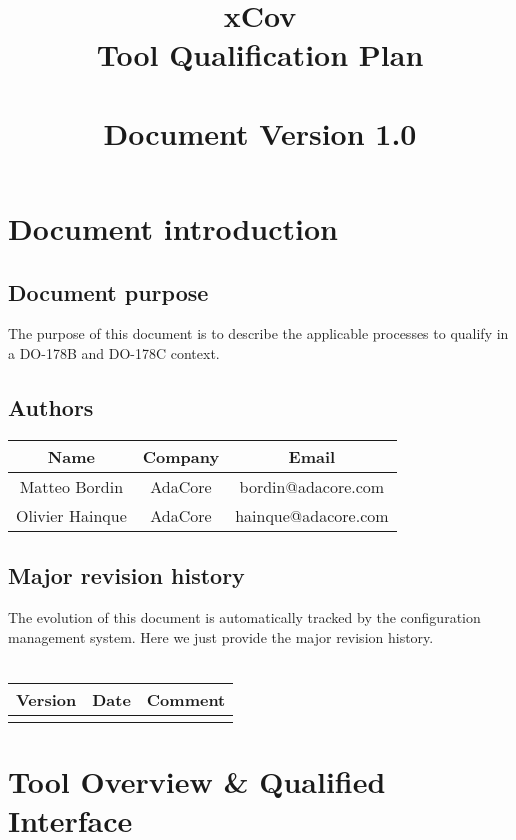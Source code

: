 \documentclass {report}
\begin{document}
\title{\huge xCov\\Tool Qualification Plan\\ \ \\ \large \textbf{Document Version 1.0}}

\maketitle
\tableofcontents

\chapter{Document introduction}

\section{Document purpose}
The purpose of this document is to describe the applicable processes to qualify \xcov{} in a DO-178B and DO-178C context.

\section{Authors}
\begin{tabular}{|c|c|c|}
\hline
\textbf{Name} & \textbf{Company} & \textbf{Email} \\ \hline
Matteo Bordin & AdaCore & bordin@adacore.com \\ \hline
Olivier Hainque & AdaCore & hainque@adacore.com \\ \hline
\end{tabular}

\section{Major revision history}
The evolution of this document is automatically tracked by the configuration management system. Here we just provide the major revision history.
\ \\ \\
\begin{tabular}{|c|c|c|}
\hline
\textbf{Version} & \textbf{Date} & \textbf{Comment} \\ \hline
 &  &  \\ \hline
\end{tabular}



\chapter{Tool Overview \& Qualified Interface}
\end{document}
